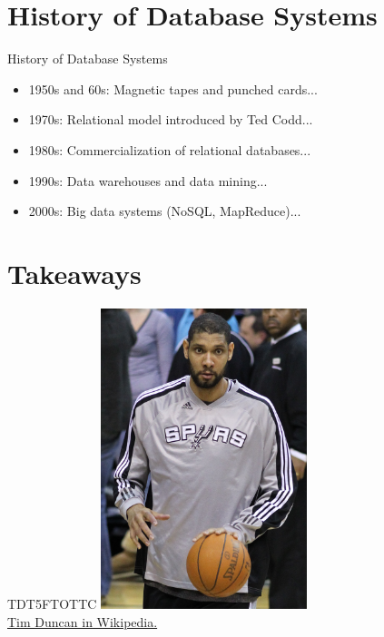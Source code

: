 \documentclass{beamer}
\begin{document}
\section{History of Database Systems}

\begin{frame}{History of Database Systems}
    \begin{itemize}
        \item 1950s and 60s: Magnetic tapes and punched cards...
        \item 1970s: Relational model introduced by Ted Codd...
        \item 1980s: Commercialization of relational databases...
        \item 1990s: Data warehouses and data mining...
        \item 2000s: Big data systems (NoSQL, MapReduce)...
    \end{itemize}
\end{frame}

\section*{Takeaways}

\begin{frame}{TDT5FTOTTC}
    \centering
    \includegraphics[width=0.45\textwidth]{figures/td.jpg}\\
    \href{https://en.wikipedia.org/wiki/Tim_Duncan}{Tim Duncan in Wikipedia.}
\end{frame}
\end{document}
